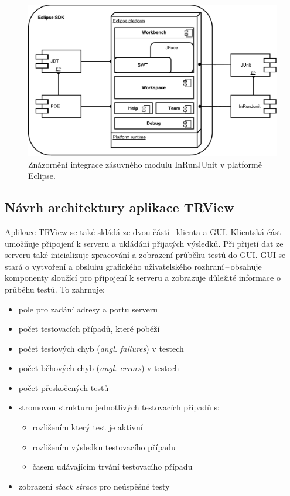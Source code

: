      \begin{figure}[h]
	\includegraphics[width=\textwidth, center]{obrazky-figures/inrunjunit_eclipse_integration.pdf}
	\caption{Znázornění integrace zásuvného modulu InRunJUnit v platformě Eclipse.}
	\label{fig:inrunjunit_eclipse_integration}
      \end{figure}

    \subsection{Návrh architektury aplikace TRView}
    Aplikace TRView se také skládá ze dvou částí\,--\,klienta a GUI. Klientská část umožňuje připojení k serveru a ukládání přijatých výsledků. Při přijetí dat ze serveru také inicializuje zpracování a zobrazení průběhu testů do GUI. GUI se stará o vytvoření a obsluhu grafického uživatelského rozhraní\,--\,obsahuje komponenty sloužící pro připojení k serveru a zobrazuje důležité informace o průběhu testů. To zahrnuje:
    \begin{itemize}
     \item pole pro zadání adresy a portu serveru
     \item počet testovacích případů, které poběží
     \item počet testových chyb (\emph{angl. failures}) v testech
     \item počet běhových chyb (\emph{angl. errors}) v testech
     \item počet přeskočených testů
     \item stromovou strukturu jednotlivých testovacích případů s:
     \begin{itemize}
      \item rozlišením který test je aktivní
      \item rozlišením výsledku testovacího případu
      \item časem udávajícím trvání testovacího případu
     \end{itemize}
     \item zobrazení \emph{stack strace} pro neúspěšné testy
    \end{itemize}

